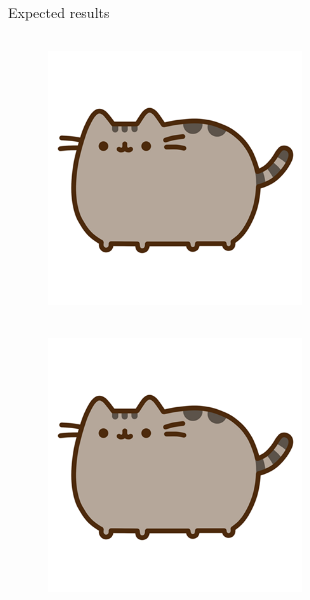 \begin{columnframe}{Expected results}
    \begin{column}{0.5\textwidth}
        \begin{figure}
            \centering
            \includegraphics[width=0.6\textwidth, frame]{images/pusheen.png}
        \end{figure}
    \end{column}
    \begin{column}{0.5\textwidth}
        \begin{figure}
            \centering
            \includegraphics[width=0.6\textwidth, frame]{images/pusheen.png}
        \end{figure}
    \end{column}
\end{columnframe}

